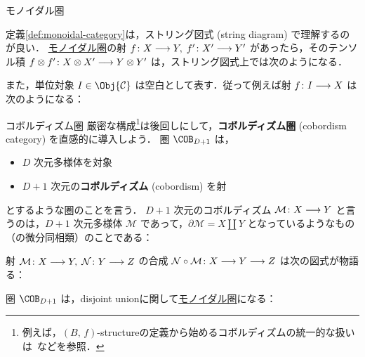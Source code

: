 \documentclass[TQFT_main]{subfiles}
\begin{document}
\begin{mydef}[label=def:monoidal-category,breakable]{モノイダル圏}
\begin{description}
        \begin{center}
        \end{center}
        
    \end{description}

\end{mydef}

定義\ref{def:monoidal-category}は，ストリング図式 (string diagram) で理解するのが良い．
\hyperref[def:monoidal-category]{モノイダル圏}の射 $f \colon X \longrightarrow Y,\; f' \colon X' \longrightarrow Y'$ があったら，そのテンソル積 $f \otimes f' \colon X \otimes X' \longrightarrow Y \otimes Y'$ は，ストリング図式上では次のようになる．

また，単位対象 $I \in \Obj{\mathcal{C}}$ は空白として表す．従って例えば射 $f \colon I \longrightarrow X$ は次のようになる：


\begin{myexample}[label=Cob-string]{コボルディズム圏}
    厳密な構成\footnote{例えば，$(B,\, f)$-structureの定義から始めるコボルディズムの統一的な扱いは~\cite[CHAPTER 1]{Kochman1996bordism}などを参照．}は後回しにして，\textbf{コボルディズム圏} (cobordism category) を直感的に導入しよう．
    圏 $\COB_{D+1}$ は，
    \begin{itemize}
        \item $D$ 次元多様体を対象
        \item $D+1$ 次元の\textbf{コボルディズム} (cobordism) を射
    \end{itemize}
    とするような圏のことを言う．
    $D+1$ 次元のコボルディズム $\mathcal{M} \colon X \longrightarrow Y$ と言うのは，$D+1$ 次元多様体 $\mathcal{M}$ であって，$\partial \mathcal{M} = X \amalg Y$ となっているようなもの（の微分同相類）のことである：

    射 $\mathcal{M} \colon X \longrightarrow Y,\; \mathcal{N} \colon Y \longrightarrow Z$ の合成 $\mathcal{N} \circ \mathcal{M} \colon X \longrightarrow Y \longrightarrow Z$ は次の図式が物語る：

    圏 $\COB_{D+1}$ は，disjoint unionに関して\hyperref[def:monoidal-category]{モノイダル圏}になる：
\end{myexample}
\end{document}
